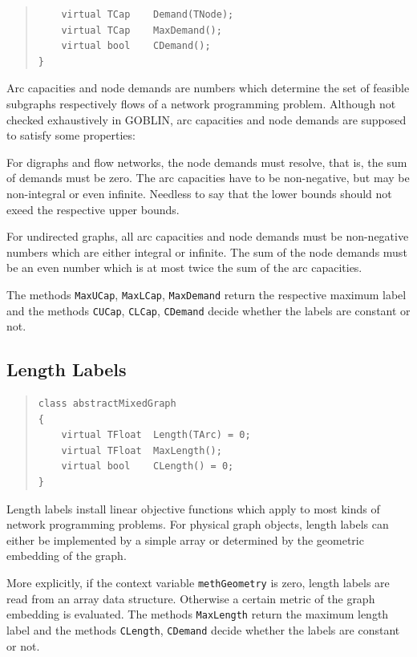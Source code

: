 \documentclass[a4paper,11pt,twoside]{book}
\begin{document}
\begin{multicols}{2}
\begin{quote}
\begin{verbatim}
    virtual TCap    Demand(TNode);
    virtual TCap    MaxDemand();
    virtual bool    CDemand();
}
\end{verbatim}
\end{quote}
Arc capacities and node demands are numbers which determine the set of feasible
subgraphs respectively flows of a network programming problem. Although not
checked exhaustively in GOBLIN, arc capacities and node demands are supposed to
satisfy some properties:

For digraphs and flow networks, the node demands must resolve, that is, the
sum of demands must be zero. The arc capacities have to be non-negative,
but may be non-integral or even infinite. Needless to say that the lower bounds
should not exeed the respective upper bounds.

For undirected graphs, all arc capacities and node demands must be non-negative
numbers which are either integral or infinite. The sum of the node demands must
be an even number which is at most twice the sum of the arc capacities.

The methods \verb/MaxUCap/, \verb/MaxLCap/, \verb/MaxDemand/ return the
respective maximum label and the methods \verb/CUCap/, \verb/CLCap/,
\verb/CDemand/ decide whether the labels are constant or not.


\subsection{Length Labels}
\label{slb_length}
\methods
\begin{quote}
\begin{verbatim}
class abstractMixedGraph
{
    virtual TFloat  Length(TArc) = 0;
    virtual TFloat  MaxLength();
    virtual bool    CLength() = 0;
}
\end{verbatim}
\end{quote}
Length labels install linear objective functions which apply to most kinds
of network programming problems. For physical graph objects, length labels can
either be implemented by a simple array or determined by the geometric
embedding of the graph.

More explicitly, if the context variable \verb/methGeometry/ is zero, length
labels are read from an array data structure. Otherwise a certain metric of
the graph embedding is evaluated. The methods \verb/MaxLength/ return the
maximum length label and the methods \verb/CLength/, \verb/CDemand/ decide
whether the labels are constant or not.


\end{multicols}
\end{document}
